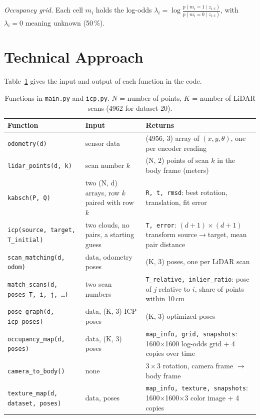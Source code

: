 \documentclass[letterpaper, 10pt, conference]{ieeeconf}
\newcommand{\code}[1]{\texttt{#1}}
\begin{document}
\emph{Occupancy grid.} Each cell $m_i$ holds the log-odds
$\lambda_i=\log\frac{p(m_i=1\mid z_{1:t})}{p(m_i=0\mid z_{1:t})}$, with
$\lambda_i=0$ meaning unknown (50\,\%).

\section{Technical Approach}

Table~\ref{tab:functions} gives the input and output of each function in the
code.

\begin{table}[t]
\caption{Functions in \code{main.py} and \code{icp.py}. $N$ = number of points, $K$ = number of LiDAR scans (4962 for dataset 20).}
\label{tab:functions}
\centering
\small
\begin{tabular}{@{}lp{}p{}@{}}
\toprule
Function & Input & Returns \\
\midrule
\code{odometry(d)} & sensor data & (4956, 3) array of $(x,y,\theta)$, one per encoder reading \\
\code{lidar\_points(d, k)} & scan number $k$ & (N, 2) points of scan $k$ in the body frame (meters) \\
\code{kabsch(P, Q)} & two (N, d) arrays, row $k$ paired with row $k$ & \code{R, t, rmsd}: best rotation, translation, fit error \\
\code{icp(source, target, T\_initial)} & two clouds, no pairs, a starting guess & \code{T, error}: $(d{+}1)\times(d{+}1)$ transform source$\to$target, mean pair distance \\
\code{scan\_matching(d, odom)} & data, odometry poses & (K, 3) poses, one per LiDAR scan \\
\code{match\_scans(d, poses\_T, i, j, \dots)} & two scan numbers & \code{T\_relative, inlier\_ratio}: pose of $j$ relative to $i$, share of points within 10\,cm \\
\code{pose\_graph(d, icp\_poses)} & data, (K, 3) ICP poses & (K, 3) optimized poses \\
\code{occupancy\_map(d, poses)} & data, (K, 3) poses & \code{map\_info, grid, snapshots}: 1600$\times$1600 log-odds grid + 4 copies over time \\
\code{camera\_to\_body()} & none & $3\times3$ rotation, camera frame $\to$ body frame \\
\code{texture\_map(d, dataset, poses)} & data, poses & \code{map\_info, texture, snapshots}: 1600$\times$1600$\times$3 color image + 4 copies \\
\bottomrule
\end{tabular}
\end{table}
\end{document}
